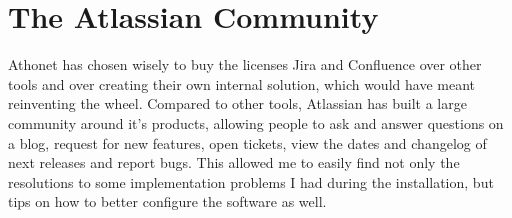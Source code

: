 \section{The Atlassian Community}

	Athonet has chosen wisely to buy the licenses Jira and Confluence over other tools and over creating their own internal solution, which would have meant reinventing the wheel.
	Compared to other tools, Atlassian has built a large community around it's products, allowing people to ask and answer questions on a blog, request for new features, open tickets, view the dates and changelog of next releases and report bugs.
	This allowed me to easily find not only the resolutions to some implementation problems I had during the installation, but tips on how to better configure the software as well.

